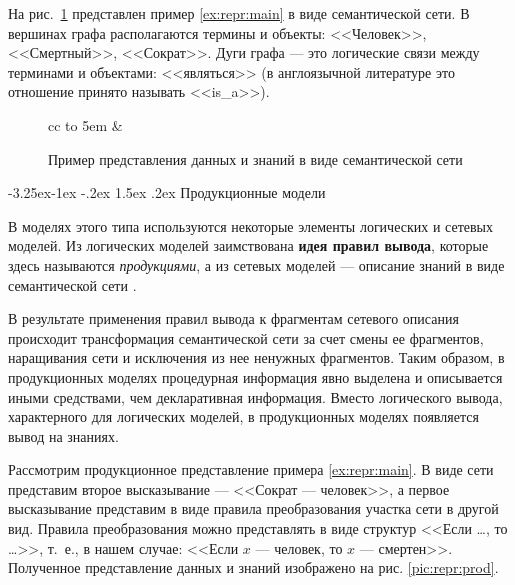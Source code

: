 \documentclass[12pt, openany, twoside]{book} %
\makeatletter
\renewcommand\subsection{\@startsection{subsection}{2}{\z@}%
                                     {-3.25ex\@plus -1ex \@minus -.2ex}%
                                     {1.5ex \@plus .2ex}%
                                     {\normalfont\normalsize\bfseries}}
\makeatother
\begin{document}
На рис.~\ref{pic:repr:semnet} представлен пример \ref{ex:repr:main} в виде семантической сети. В вершинах графа располагаются термины и объекты: <<Человек>>, <<Смертный>>, <<Сократ>>. Дуги графа --- это логические связи между терминами и объектами: <<являться>> (в англоязычной литературе это отношение принято называть <<is\_a>>).
\begin{figure}\small
\begin{center}%
  \begin{tabular}{cc}
	\hbox to 5em {} &
  \end{tabular}
%
%
\end{center}%
\caption{Пример представления данных и знаний в виде семантической сети}
\label{pic:repr:semnet}
\end{figure}

\subsection{Продукционные модели}

В моделях этого типа используются некоторые элементы логических и сетевых моделей. Из логических моделей заимствована {\bf идея правил вывода}, которые здесь называются {\em продукциями}, а из сетевых моделей --- описание знаний в виде семантической сети \cite{AIDictionary}.

В результате применения правил вывода к фрагментам сетевого описания происходит трансформация семантической сети за счет смены ее фрагментов, наращивания сети и исключения из нее ненужных фрагментов. Таким образом, в продукционных моделях процедурная информация явно выделена и описывается иными средствами, чем декларативная информация. Вместо логического вывода, характерного для логических моделей, в продукционных моделях появляется вывод на знаниях.

Рассмотрим продукционное представление примера \ref{ex:repr:main}. В виде сети представим второе высказывание --- <<Сократ --- человек>>, а первое высказывание представим в виде правила преобразования участка сети в другой вид. Правила преобразования можно представлять в виде структур <<Если \ldots, то \ldots >>, т.~е., в нашем случае: <<Если $x$ --- человек, то $x$ --- смертен>>. Полученное представление данных и знаний изображено на рис. \ref{pic:repr:prod}.
\end{document}
